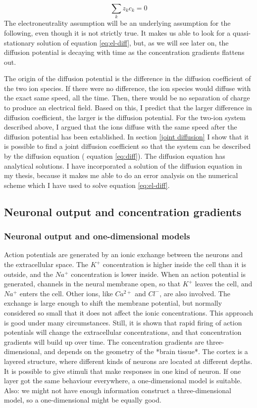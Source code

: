 \documentclass{article}
\begin{document}
$$\sum _k z_k c_k =0$$
The electroneutrality assumption will be an underlying assumption for the following, even though it is not strictly true. It makes us able to look for a quasi-stationary solution of equation \ref{eq:el-diff}, but, as we will see later on, the diffusion potential is decaying with time as the concentration gradients flattens out. 



The origin of the diffusion potential is the difference in the diffusion coefficient of the two ion species. If there were no difference, the ion species would diffuse with the exact same speed, all the time. Then, there would be no separation of charge to produce an electrical field. Based on this, I predict that the larger difference in diffusion coefficient, the larger is the diffusion potential. For the two-ion system described above, I argued that the ions diffuse with the same speed after the diffusion potential has been established. In section \ref{joint diffusion} I show that  it is possible to find a joint diffusion coefficient so that the system can be described by the diffusion equation ( equation  \ref{eq:diff}). The diffusion equation has analytical solutions. I have incorporated a solution of the diffusion equation in my thesis, because it makes me able to do an error analysis on the numerical scheme which I have used to solve   equation \ref{eq:el-diff}.



 


\subsection{Neuronal output and concentration gradients}
\subsubsection{Neuronal output and one-dimensional models}
Action potentials are generated by an ionic exchange between the neurons and the extracellular space. The $K^+$ concentration is higher inside the cell than it is outside, and the $Na^+$ concentration is lower inside. When an action potential is generated,  channels in the neural membrane open, so that $K^+$ leaves the cell, and $Na^+$ enters the cell. Other ions, like $Ca^{2+}$ and $Cl^-$, are also involved. The exchange is large enough to shift the membrane potential, but normally considered so small that it does not affect the ionic concentrations. This approach is good under many circumstances. Still, it is shown that rapid firing of action potentials will change the extracellular concentrations, and that concentration gradients will build up over time. The concentration gradients are three-dimensional, and depends on the geometry of the *brain tissue*.  The cortex is a layered structure, where different kinds of neurons are located at different depths. It is possible to give stimuli that make responses in one kind of neuron. If one layer got the same behaviour everywhere, a one-dimensional model is suitable. Also: we might not have enough information construct a three-dimensional model, so a one-dimensional might be equally good. 
\end{document}

